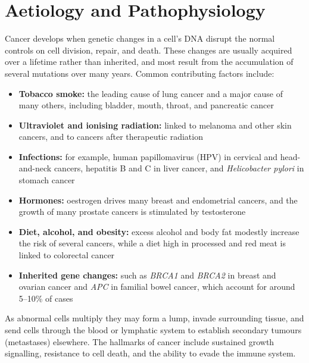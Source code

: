 \section*{Aetiology and Pathophysiology}
Cancer develops when genetic changes in a cell's DNA disrupt the normal controls on cell division, repair, and death. These changes are usually acquired over a lifetime rather than inherited, and most result from the accumulation of several mutations over many years. Common contributing factors include:
\begin{itemize}
    \item \textbf{Tobacco smoke:} the leading cause of lung cancer and a major cause of many others, including bladder, mouth, throat, and pancreatic cancer
    \item \textbf{Ultraviolet and ionising radiation:} linked to melanoma and other skin cancers, and to cancers after therapeutic radiation
    \item \textbf{Infections:} for example, human papillomavirus (HPV) in cervical and head-and-neck cancers, hepatitis B and C in liver cancer, and \textit{Helicobacter pylori} in stomach cancer
    \item \textbf{Hormones:} oestrogen drives many breast and endometrial cancers, and the growth of many prostate cancers is stimulated by testosterone
    \item \textbf{Diet, alcohol, and obesity:} excess alcohol and body fat modestly increase the risk of several cancers, while a diet high in processed and red meat is linked to colorectal cancer
    \item \textbf{Inherited gene changes:} such as \textit{BRCA1} and \textit{BRCA2} in breast and ovarian cancer and \textit{APC} in familial bowel cancer, which account for around 5--10\% of cases
\end{itemize}
As abnormal cells multiply they may form a lump, invade surrounding tissue, and send cells through the blood or lymphatic system to establish secondary tumours (metastases) elsewhere. The hallmarks of cancer include sustained growth signalling, resistance to cell death, and the ability to evade the immune system.

